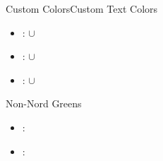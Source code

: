 \documentclass[\string~/GitHub/sthlmNordBeamerTheme/sthlmNordLightDemo.tex]{subfiles}
\begin{document}
\begin{frame}{Custom Colors}{Custom Text Colors}
\begin{itemize}
		\item  {}: \texttt{} \( \cup \) \texttt{}
		\item  {}: \texttt{} \( \cup \) \texttt{}
		\item  {}: \texttt{} \( \cup \) \texttt{}
	\end{itemize}
	\framebreak
	{\Large{Non-Nord Greens}}
	\begin{itemize}
		\item {}: \texttt{}
		\item {}: \texttt{}
	\end{itemize}
\end{frame}
\end{document}
